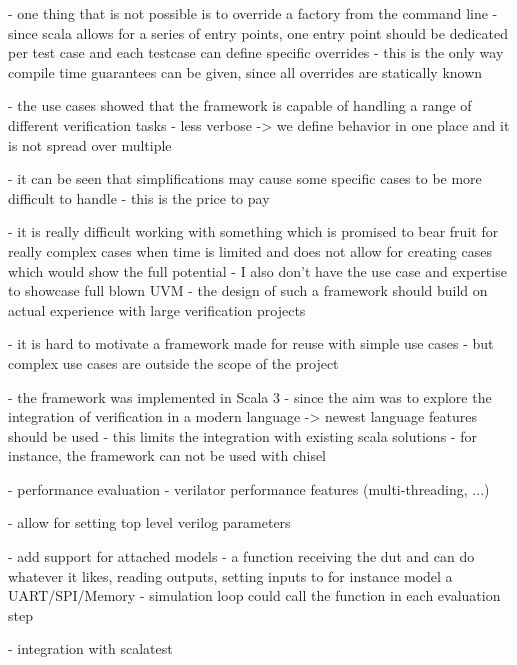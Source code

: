 - one thing that is not possible is to override a factory from the command line
- since scala allows for a series of entry points, one entry point should be dedicated per test case and each testcase can define specific overrides
- this is the only way compile time guarantees can be given, since all overrides are statically known

- the use cases showed that the framework is capable of handling a range of different verification tasks
- less verbose -> we define behavior in one place and it is not spread over multiple



- it can be seen that simplifications may cause some specific cases to be more difficult to handle
- this is the price to pay

- it is really difficult working with something which is promised to bear fruit for really complex cases when time is
limited and does not allow for creating cases which would show the full potential
- I also don't have the use case and expertise to showcase full blown UVM
- the design of such a framework should build on actual experience with large verification projects

- it is hard to motivate a framework made for reuse with simple use cases
- but complex use cases are outside the scope of the project



- the framework was implemented in Scala 3
- since the aim was to explore the integration of verification in a modern language -> newest language features should be used
- this limits the integration with existing scala solutions
- for instance, the framework can not be used with chisel

- performance evaluation
- verilator performance features (multi-threading, ...)

- allow for setting top level verilog parameters

- add support for attached models
- a function receiving the dut and can do whatever it likes, reading outputs, setting inputs to for instance model a
UART/SPI/Memory
- simulation loop could call the function in each evaluation step

- integration with scalatest




